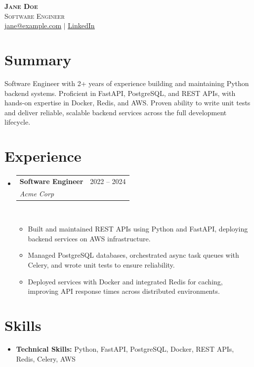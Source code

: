 \documentclass[letterpaper,11pt]{article}
\newcommand{\resumeItem}[1]{\item\small{{#1 \vspace{-3pt}}}}
\newcommand{\resumeSubheading}[4]{
  \vspace{-3pt}\item
    \begin{tabularx}{0.995\textwidth}[t]{Xr}
      \textbf{#1} & #2 \\
      \textit{\small#3} & \textit{\small #4} \\
    \end{tabularx}\\[-3pt]
    \vspace{3pt}
}
\newcommand{\resumeItemListStart}{\begin{itemize}}
\newcommand{\resumeItemListEnd}{\end{itemize}\vspace{-4pt}}
\newcommand{\resumeSubHeadingListStart}{
  \begin{itemize}[leftmargin=0.12in, label={}]
  \setlength{\itemsep}{0pt}
  \setlength{\parsep}{0pt}
  \setlength{\parskip}{0pt}
}
\newcommand{\resumeSubHeadingListEnd}{\end{itemize}}
\begin{document}
\begin{center}
    \textbf{\LARGE \scshape Jane Doe} \\ \vspace{1pt}
    \small\textsc{Software Engineer} \\ \vspace{1pt}
    \small \href{mailto:jane@example.com}{\underline{jane@example.com}} $|$ \href{https://linkedin.com/in/janedoe}{\underline{LinkedIn}} \\
\end{center}

\vspace{-4pt}
\section{Summary}
\vspace{-4pt}
\small{Software Engineer with 2+ years of experience building and maintaining Python backend systems. Proficient in FastAPI, PostgreSQL, and REST APIs, with hands-on expertise in Docker, Redis, and AWS. Proven ability to write unit tests and deliver reliable, scalable backend services across the full development lifecycle.}
\vspace{2pt}

\section{Experience}
\vspace{-4pt}
\resumeSubHeadingListStart
\resumeSubheading{Software Engineer}{2022 -- 2024}{Acme Corp}{}
\resumeItemListStart
\resumeItem{Built and maintained REST APIs using Python and FastAPI, deploying backend services on AWS infrastructure.}
\resumeItem{Managed PostgreSQL databases, orchestrated async task queues with Celery, and wrote unit tests to ensure reliability.}
\resumeItem{Deployed services with Docker and integrated Redis for caching, improving API response times across distributed environments.}
\resumeItemListEnd
\resumeSubHeadingListEnd

\section{Skills}
\vspace{-4pt}
\begin{itemize}[leftmargin=0in, label={}, itemsep=1pt, topsep=2pt, parsep=0pt]
    \item \small{\textbf{Technical Skills:} Python, FastAPI, PostgreSQL, Docker, REST APIs, Redis, Celery, AWS}
\end{itemize}
\end{document}
